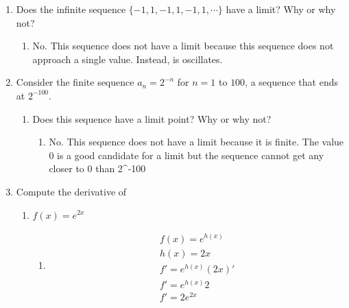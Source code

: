 \documentclass[krantz1,ChapterTOCs]{krantz}
\begin{document}
\begin{enumerate}
\begin{enumerate}
\begin{enumerate}
        
    \end{enumerate}
    
    \item Does the infinite sequence $\{-1,1,-1,1,-1,1, \cdots \}$ have a limit? Why or why not? 
    
    \begin{enumerate}
            \item   {\color{red} No. This sequence does not have a limit because this sequence does not approach a single value. Instead, is oscillates. }
        \end{enumerate}
        
    
    \item Consider the finite sequence $a_{n} = 2^{-n}$ for $n=1$ to $100$, a sequence that ends at $2^{-100}$. 
    \begin{enumerate}
        \item Does this sequence have a limit point? Why or why not?
        \begin{enumerate}
            \item  {\color{red} No. This sequence does not have a limit because it is finite. The value 0 is a good candidate for a limit but the sequence cannot get any closer to 0 than 2^{-100} }
        \end{enumerate}
        
        
    \end{enumerate}
    
    \item Compute the derivative of 
    \begin{enumerate}
        \item $f(x) = e^{2x}$
        \begin{enumerate}
            \item  {\color{red} 
            \begin{align}
                f(x) = e^{h(x)} \\ 
                h(x) = 2x\\
                f' = e^{h(x)} (2x)' \\
                f' = e^{h(x)} 2 \\
                f' = 2e^{2x} 
            \end{align}
            }
        \end{enumerate}
        

\end{enumerate}
\end{enumerate}
\end{enumerate}
\end{document}
